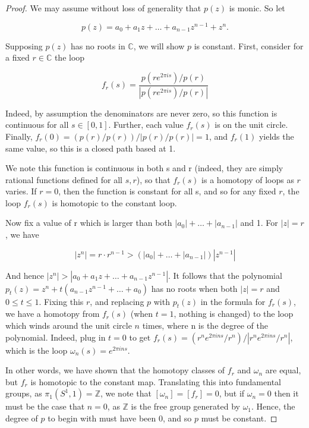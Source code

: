 \documentclass[leqno]{article}
\theoremstyle{nonumberplain}
\newtheorem{proof}{Proof}
\begin{document}
\begin{proof}
We may assume without loss of generality that $p(z)$ is monic. So let

\[\displaystyle p(z) = a_0 + a_1z + \dots + a_{n-1}z^{n-1} + z^n.\]

Supposing $p(z)$ has no roots in $\mathbb{C}$, we will show $p$ is constant. First, consider for a fixed $r \in \mathbb{C}$ the loop

\[\displaystyle f_r(s) = \frac{p(re^{2 \pi is})/p(r)}{\left | p(re^{2 \pi is})/p(r) \right |}\]

Indeed, by assumption the denominators are never zero, so this function is continuous for all $s \in [0,1]$. Further, each value $f_r(s)$ is on the unit circle. Finally, $f_r(0) = (p(r)/p(r)) / |p(r)/p(r)| = 1$, and $f_r(1)$ yields the same value, so this is a closed path based at 1.

We note this function is continuous in both s and r (indeed, they are simply rational functions defined for all $s,r$), so that $f_r(s)$ is a homotopy of loops as $r$ varies. If $r=0$, then the function is constant for all s, and so for any fixed $r$, the loop $f_r(s)$ is homotopic to the constant loop.

Now fix a value of r which is larger than both $|a_0| + \dots + |a_{n-1}|$ and 1. For $|z| = r$, we have

\[\displaystyle |z^n| = r \cdot r^{n-1} > (|a_0| + \dots + |a_{n-1}|)|z^{n-1}|\]

And hence $|z^n| > |a_0 + a_1z + \dots + a_{n-1}z^{n-1}|$. It follows that the polynomial $p_t(z) = z^n + t(a_{n-1}z^{n-1} + \dots + a_0)$ has no roots when both $|z| = r$ and $0 \leq t \leq 1$. Fixing this $r$, and replacing $p$ with $p_t(z)$ in the formula for $f_r(s)$, we have a homotopy from $f_r(s)$ (when $t=1$, nothing is changed) to the loop which winds around the unit circle $n$ times, where n is the degree of the polynomial. Indeed, plug in $t=0$ to get $f_r(s) = (r^ne^{2 \pi ins}/r^n)/|r^ne^{2 \pi ins}/r^n|$, which is the loop $\omega_n(s) = e^{2 \pi ins}$.

In other words, we have shown that the homotopy classes of $f_r$ and $\omega_n$ are equal, but $f_r$ is homotopic to the constant map. Translating this into fundamental groups, as $\pi_1(S^1,1) = \mathbb{Z}$, we note that $[\omega_n] = [f_r] = 0$, but if $\omega_n = 0$ then it must be the case that $n = 0$, as $\mathbb{Z}$ is the free group generated by $\omega_1$. Hence, the degree of $p$ to begin with must have been 0, and so $p$ must be constant.
\end{proof}



\pagebreak
\end{document}
